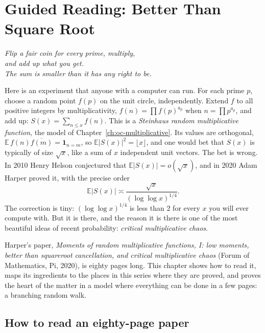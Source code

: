 \chapter{Guided Reading: Better Than Square Root}
\label{ch:chaos}

\begin{center}\itshape
Flip a fair coin for every prime, multiply,\\
and add up what you get.\\
The sum is smaller than it has any right to be.
\end{center}

Here is an experiment that anyone with a computer can run. For each prime $p$, choose a random point $f(p)$ on the unit circle, independently. Extend $f$ to all positive integers by multiplicativity,
$f(n)=\prod f(p)^{a_p}$ when $n=\prod p^{a_p}$, and add up: $S(x)=\sum_{n\le x}f(n)$. This is a \emph{Steinhaus random multiplicative function}, the model of Chapter~\ref{ch:oc-multiplicative}. Its values are
orthogonal, $\mathbb E\,f(n)\overline{f(m)}=\mathbf 1_{n=m}$, so $\mathbb E|S(x)|^2=\lfloor x\rfloor$, and one would bet that $S(x)$ is typically of size $\sqrt x$, like a sum of $x$ independent
unit vectors. The bet is wrong. In 2010 Henry Helson conjectured that $\mathbb E|S(x)|=o(\sqrt x)$, and in 2020 Adam Harper proved it, with the precise order
\[
\mathbb E|S(x)|\asymp\frac{\sqrt x}{(\log\log x)^{1/4}}.
\]
The correction is tiny: $(\log\log x)^{1/4}$ is less than $2$ for every $x$ you will ever compute with. But it is there, and the reason it is there is one of the most beautiful ideas of recent probability: \emph{critical multiplicative chaos}.

Harper's paper, \emph{Moments of random multiplicative functions, I: low moments, better than squareroot cancellation, and critical multiplicative chaos} (Forum of Mathematics, Pi, 2020), is eighty pages long. This chapter shows how to read it, maps its ingredients to the places in this series where they are proved, and proves the heart of the matter in a model where everything can be done in a few pages: a branching random walk.

\section{How to read an eighty-page paper}

